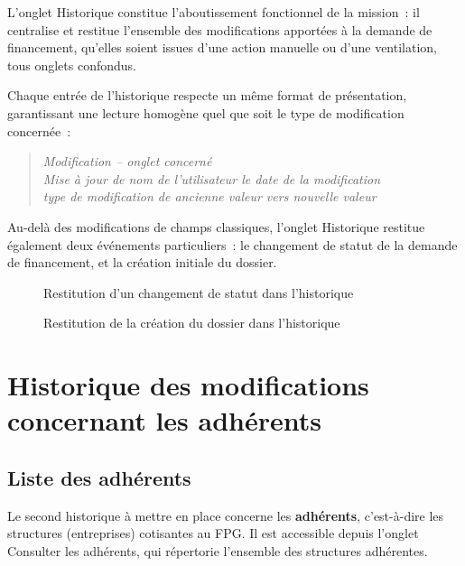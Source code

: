 L'onglet Historique constitue l'aboutissement fonctionnel de la
mission~: il centralise et restitue l'ensemble des modifications
apportées à la demande de financement, qu'elles soient issues d'une
action manuelle ou d'une ventilation, tous onglets confondus.

Chaque entrée de l'historique respecte un même format de présentation,
garantissant une lecture homogène quel que soit le type de modification
concernée~:

\begin{quote}
\textit{Modification -- \og{}onglet concerné\fg{}}\\
\textit{Mise à jour de \og{}nom de l'utilisateur\fg{} le \og{}date de
la modification\fg{}}\\
\textit{\og{}type de modification\fg{} de \og{}ancienne valeur\fg{} vers
\og{}nouvelle valeur\fg{}}
\end{quote}

Au-delà des modifications de champs classiques, l'onglet Historique
restitue également deux événements particuliers~: le changement de
statut de la demande de financement, et la création initiale du dossier.

\begin{figure}[H]
  \centering
  \caption{Restitution d'un changement de statut dans l'historique}
  \label{fig:modif-etat-hist}
\end{figure}

\begin{figure}[H]
  \centering
  \caption{Restitution de la création du dossier dans l'historique}
  \label{fig:creation-dossier}
\end{figure}


\section{Historique des modifications concernant les adhérents}
\label{sec:historisation-adherents}

\subsection{Liste des adhérents}

Le second historique à mettre en place concerne les \textbf{adhérents},
c'est-à-dire les structures (entreprises) cotisantes au FPG. Il est
accessible depuis l'onglet \og{}Consulter les adhérents\fg{}, qui
répertorie l'ensemble des structures adhérentes.

